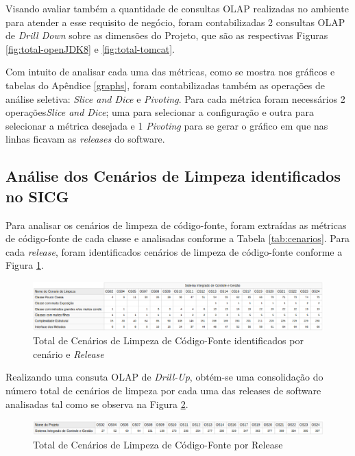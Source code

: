 Visando avaliar também a quantidade de consultas OLAP realizadas no ambiente para atender a esse requisito de negócio, foram contabilizadas 2 consultas OLAP de \textit{Drill Down} sobre as dimensões do Projeto, que são as respectivas Figuras \ref{fig:total-openJDK8} e \ref{fig:total-tomcat}. 

Com intuito de analisar cada uma das métricas, como se mostra nos gráficos e tabelas do Apêndice \ref{graphs}, foram contabilizadas também as operações de análise seletiva: \textit{Slice and Dice} e \textit{Pivoting}. Para cada métrica foram necessários 2 operações\textit{Slice and Dice}; uma para selecionar a configuração e outra para selecionar a métrica desejada e 1 \textit{Pivoting} para se gerar o gráfico em que nas linhas ficavam as \textit{releases} do software.  
 

\subsection{Análise dos Cenários de Limpeza identificados no SICG}

Para analisar os cenários de limpeza de código-fonte, foram extraídas as métricas de código-fonte de cada classe e analisadas conforme a Tabela \ref{tab:cenarios}. Para cada \textit{release}, foram identificados cenários de limpeza de código-fonte conforme a Figura \ref{fig:cenarios-release}.


\begin{figure}[ht!]
\centering
\includegraphics[keepaspectratio=true,scale=0.47]{figuras/total-cenario-tipo.eps}
\caption{Total de Cenários de Limpeza de Código-Fonte identificados por cenário e \textit{Release}}
\label{fig:cenarios-release}
\end{figure}
\FloatBarrier


Realizando uma consuta OLAP de \textit{Drill-Up}, obtém-se uma consolidação do número total de cenários de limpeza por cada uma das releases de software analisadas tal como se observa na Figura \ref{fig:cenarios-total}.

\begin{figure}[ht!]
\centering
\includegraphics[keepaspectratio=true,scale=0.48]{figuras/total-cenarios-release.eps}
\caption{Total de Cenários de Limpeza de Código-Fonte por Release}
\label{fig:cenarios-total}
\end{figure}
\FloatBarrier

